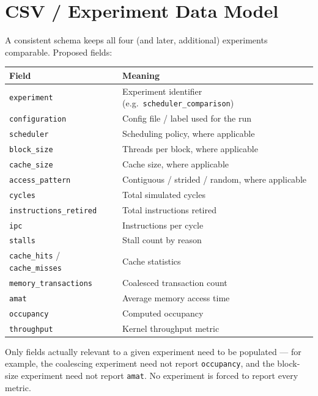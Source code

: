 \documentclass[11pt]{article}
\begin{document}
\section{CSV / Experiment Data Model}

A consistent schema keeps all four (and later, additional) experiments
comparable. Proposed fields:

\begin{center}
\begin{tabularx}{\textwidth}{@{}p{4cm}X@{}}
\toprule
\textbf{Field} & \textbf{Meaning} \\
\midrule
\texttt{experiment} & Experiment identifier (e.g.\ \texttt{scheduler\_comparison}) \\
\texttt{configuration} & Config file / label used for the run \\
\texttt{scheduler} & Scheduling policy, where applicable \\
\texttt{block\_size} & Threads per block, where applicable \\
\texttt{cache\_size} & Cache size, where applicable \\
\texttt{access\_pattern} & Contiguous / strided / random, where applicable \\
\texttt{cycles} & Total simulated cycles \\
\texttt{instructions\_retired} & Total instructions retired \\
\texttt{ipc} & Instructions per cycle \\
\texttt{stalls} & Stall count by reason \\
\texttt{cache\_hits} / \texttt{cache\_misses} & Cache statistics \\
\texttt{memory\_transactions} & Coalesced transaction count \\
\texttt{amat} & Average memory access time \\
\texttt{occupancy} & Computed occupancy \\
\texttt{throughput} & Kernel throughput metric \\
\bottomrule
\end{tabularx}
\end{center}

Only fields actually relevant to a given experiment need to be populated
--- for example, the coalescing experiment need not report
\texttt{occupancy}, and the block-size experiment need not report
\texttt{amat}. No experiment is forced to report every metric.
\end{document}
